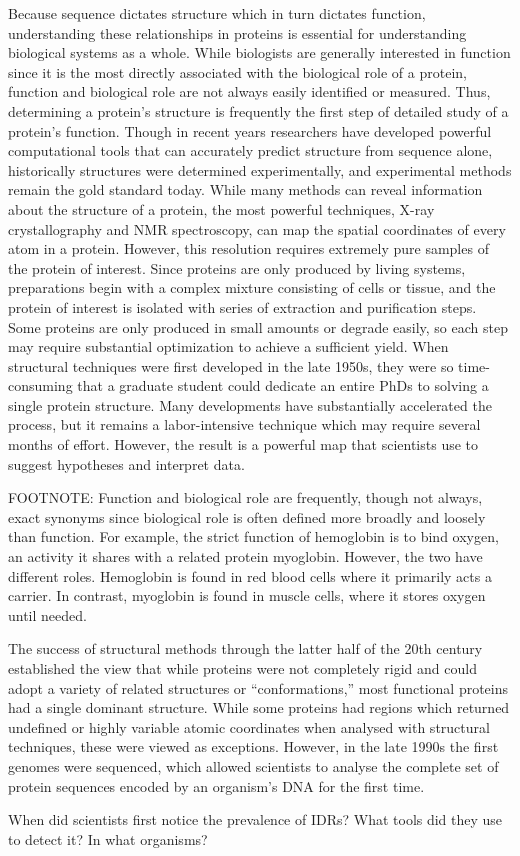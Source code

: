 Because sequence dictates structure which in turn dictates function, understanding these relationships in proteins is essential for understanding biological systems as a whole. While biologists are generally interested in function since it is the most directly associated with the biological role of a protein, function and biological role are not always easily identified or measured. Thus, determining a protein's structure is frequently the first step of detailed study of a protein's function. Though in recent years researchers have developed powerful computational tools that can accurately predict structure from sequence alone, historically structures were determined experimentally, and experimental methods remain the gold standard today. While many methods can reveal information about the structure of a protein, the most powerful techniques, X-ray crystallography and NMR spectroscopy, can map the spatial coordinates of every atom in a protein. However, this resolution requires extremely pure samples of the protein of interest. Since proteins are only produced by living systems, preparations begin with a complex mixture consisting of cells or tissue, and the protein of interest is isolated with series of extraction and purification steps. Some proteins are only produced in small amounts or degrade easily, so each step may require substantial optimization to achieve a sufficient yield. When structural techniques were first developed in the late 1950s, they were so time-consuming that a graduate student could dedicate an entire PhDs to solving a single protein structure. Many developments have substantially accelerated the process, but it remains a labor-intensive technique which may require several months of effort. However, the result is a powerful map that scientists use to suggest hypotheses and interpret data.

FOOTNOTE: Function and biological role are frequently, though not always, exact synonyms since biological role is often defined more broadly and loosely than function. For example, the strict function of hemoglobin is to bind oxygen, an activity it shares with a related protein myoglobin. However, the two have different roles. Hemoglobin is found in red blood cells where it primarily acts a carrier. In contrast, myoglobin is found in muscle cells, where it stores oxygen until needed.

The success of structural methods through the latter half of the 20th century established the view that while proteins were not completely rigid and could adopt a variety of related structures or ``conformations,'' most functional proteins had a single dominant structure. While some proteins had regions which returned undefined or highly variable atomic coordinates when analysed with structural techniques, these were viewed as exceptions. However, in the late 1990s the first genomes were sequenced, which allowed scientists to analyse the complete set of protein sequences encoded by an organism's DNA for the first time.

When did scientists first notice the prevalence of IDRs?
What tools did they use to detect it?
In what organisms?